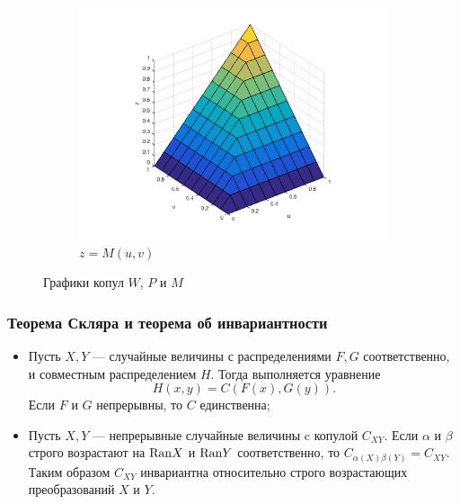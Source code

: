 \documentclass[11pt]{beamer}
\begin{document}
\begin{frame}
\begin{figure}[H]
\begin{subfigure}{.3\textwidth}
    \includegraphics[width=\linewidth]{M.png}
    \caption{$z = M(u, v)$}
  \end{subfigure}
  \caption{Графики копул $W$, $P$ и $M$}
\end{figure}
\end{frame}

\begin{frame}
\frametitle{Теорема Скляра и теорема об инвариантности}
\begin{itemize}
\item Пусть $X, Y$ --- случайные величины с распределениями $F, G$ соответственно, и совместным распределением $H$. Тогда выполняется уравнение
\begin{equation}
  H(x, y) = C(F(x), G(y)).
\end{equation}
Если $F$ и $G$ непрерывны, то $C$ единственна;

\item Пусть $X, Y$ --- непрерывные случайные величины c копулой $C_{XY}$. Если $\alpha$ и $\beta$ строго возрастают на $\mathrm{Ran}{X}$ и $\mathrm{Ran}{Y}$ соответственно, то $C_{\alpha(X)\beta(Y)} = C_{XY}$. Таким образом $C_{XY}$ инвариантна относительно строго возрастающих преобразований $X$ и $Y$.
\end{itemize}
\end{frame}
\end{document}
